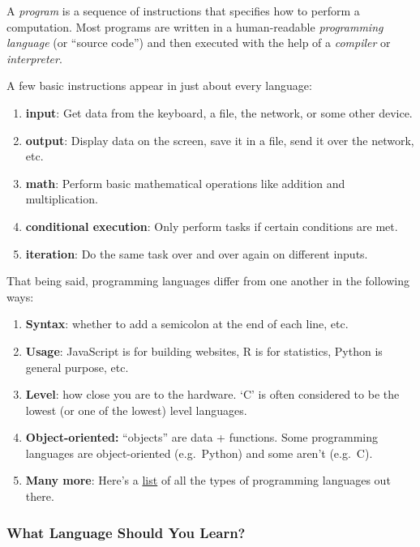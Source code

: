 \documentclass[]{book}
\providecommand{\tightlist}{%
  \setlength{\itemsep}{0pt}\setlength{\parskip}{0pt}}
\begin{document}
A \emph{program} is a sequence of instructions that specifies how to
perform a computation. Most programs are written in a human-readable
\emph{programming language} (or ``source code'') and then executed with
the help of a \emph{compiler} or \emph{interpreter}.

A few basic instructions appear in just about every language:

\begin{enumerate}
\def\labelenumi{\arabic{enumi}.}
\tightlist
\item
  \textbf{input}: Get data from the keyboard, a file, the network, or
  some other device.
\item
  \textbf{output}: Display data on the screen, save it in a file, send
  it over the network, etc.
\item
  \textbf{math}: Perform basic mathematical operations like addition and
  multiplication.
\item
  \textbf{conditional execution}: Only perform tasks if certain
  conditions are met.
\item
  \textbf{iteration}: Do the same task over and over again on different
  inputs.
\end{enumerate}

That being said, programming languages differ from one another in the
following ways:

\begin{enumerate}
\def\labelenumi{\arabic{enumi}.}
\tightlist
\item
  \textbf{Syntax}: whether to add a semicolon at the end of each line,
  etc.
\item
  \textbf{Usage}: JavaScript is for building websites, R is for
  statistics, Python is general purpose, etc.
\item
  \textbf{Level}: how close you are to the hardware. `C' is often
  considered to be the lowest (or one of the lowest) level languages.
\item
  \textbf{Object-oriented:} ``objects'' are data + functions. Some
  programming languages are object-oriented (e.g.~Python) and some
  aren't (e.g.~C).
\item
  \textbf{Many more}: Here's a
  \href{https://en.wikipedia.org/wiki/List_of_programming_languages_by_type}{list}
  of all the types of programming languages out there.
\end{enumerate}

\subsubsection*{What Language Should You
Learn?}\label{what-language-should-you-learn}
\end{document}

